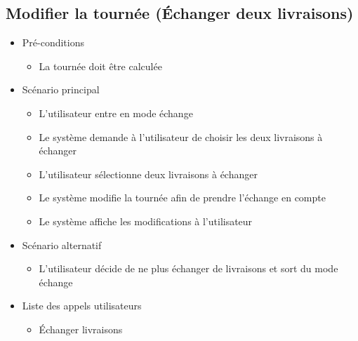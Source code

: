 \documentclass[10pt,a4paper]{book}
\begin{document}
\subsection{Modifier la tournée (Échanger deux livraisons)}
\begin{itemize}
	\item{Pré-conditions}
		\begin{itemize}
		\item{La tournée doit être calculée}
	\end{itemize}
	\item{Scénario principal}
	\begin{itemize}
		\item{L’utilisateur entre en mode échange}
		\item{Le système demande à l’utilisateur de choisir les deux livraisons à échanger}
		\item{L’utilisateur sélectionne deux livraisons à échanger}
		\item{Le système modifie la tournée afin de prendre l’échange en compte}
		\item{Le système affiche les modifications à l’utilisateur}
	\end{itemize}
	\item{Scénario alternatif}
	\begin{itemize}
				\item L'utilisateur décide de ne plus échanger de livraisons et sort du mode échange
			\end{itemize}
	\item{Liste des appels utilisateurs}
	\begin{itemize}
		\item{Échanger livraisons}
	\end{itemize}
\end{itemize}
\end{document}
